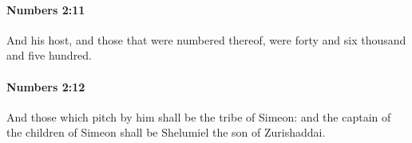 		\paragraph{Numbers 2:11} %
			\label{NUMBERS-2-11}

			And his host, and those that were numbered thereof, were forty and six thousand and five hundred.


		\paragraph{Numbers 2:12} %
			\label{NUMBERS-2-12}

			And those which pitch by him shall be the tribe of Simeon: and the captain of the children of Simeon shall be Shelumiel the son of Zurishaddai.


